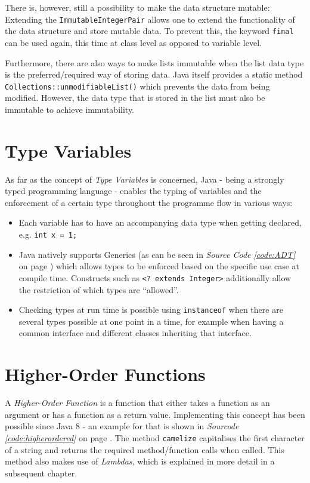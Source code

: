 \documentclass[a4paper,12pt,twoside]{scrreprt}
\begin{document}
There is, however, still a possibility to make the data structure mutable: Extending the \texttt{ImmutableIntegerPair} allows one to extend the functionality of the data structure and store mutable data. To prevent this, the keyword \texttt{final} can be used again, this time at class level as opposed to variable level.

\medskip

Furthermore, there are also ways to make lists immutable when the list data type is the preferred/required way of storing data. Java itself provides a static method \texttt{Collections::unmodifiableList()} which prevents the data from being modified. However, the data type that is stored in the list must also be immutable to achieve immutability.

\section{Type Variables}
As far as the concept of \textit{Type Variables} is concerned, Java - being a strongly typed programming language - enables the typing of variables and the enforcement of a certain type throughout the programme flow in various ways:

\begin{itemize}
    \item Each variable has to have an accompanying data type when getting declared, e.g. \texttt{int x = 1;}
    \item Java natively supports Generics (as can be seen in \textit{Source Code \ref{code:ADT}} on page \pageref{code:ADT}) which allows types to be enforced based on the specific use case at compile time. Constructs such as \texttt{<? extends Integer>} additionally allow the restriction of which types are \enquote{allowed}.
    \item Checking types at run time is possible using \texttt{instanceof} when there are several types possible at one point in a time, for example when having a common interface and different classes inheriting that interface.
\end{itemize}

\clearpage

\section{Higher-Order Functions}
A \textit{Higher-Order Function} is a function that either takes a function as an argument or has a function as a return value. Implementing this concept has been possible since Java 8 - an example for that is shown in \textit{Sourcode \ref{code:higherordered}} on page \pageref{code:higherordered}. The method \texttt{camelize} capitalises the first character of a string and returns the required method/function calls when called. This method also makes use of \textit{Lambdas}, which is explained in more detail in a subsequent chapter.
\end{document}
